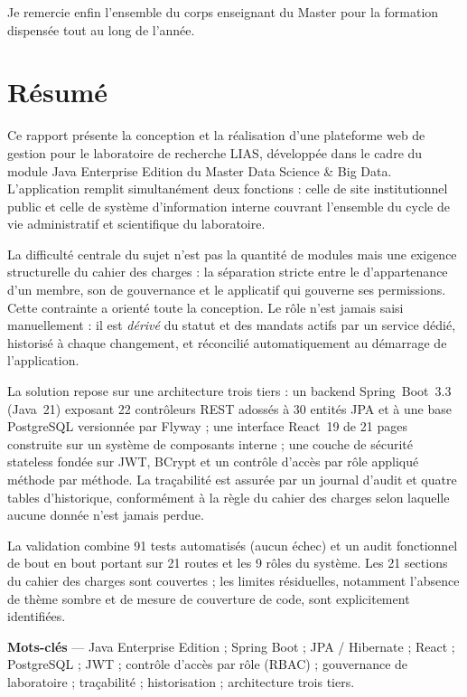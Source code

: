 Je remercie enfin l'ensemble du corps enseignant du Master pour la formation dispensée
tout au long de l'année.

\chapter*{Résumé}

Ce rapport présente la conception et la réalisation d'une plateforme web de gestion pour
le laboratoire de recherche LIAS, développée dans le cadre du module Java Enterprise
Edition du Master Data Science \& Big Data. L'application remplit simultanément deux
fonctions : celle de site institutionnel public et celle de système d'information interne
couvrant l'ensemble du cycle de vie administratif et scientifique du laboratoire.

La difficulté centrale du sujet n'est pas la quantité de modules mais une exigence
structurelle du cahier des charges : la séparation stricte entre le \srt{} d'appartenance
d'un membre, son \man{} de gouvernance et le \rol{} applicatif qui gouverne ses
permissions. Cette contrainte a orienté toute la conception. Le rôle n'est jamais saisi
manuellement : il est \emph{dérivé} du statut et des mandats actifs par un service
dédié, historisé à chaque changement, et réconcilié automatiquement au démarrage de
l'application.

La solution repose sur une architecture trois tiers : un backend Spring~Boot~3.3
(Java~21) exposant 22 contrôleurs REST adossés à 30 entités JPA et à une base
PostgreSQL versionnée par Flyway ; une interface React~19 de 21 pages construite sur un
système de composants interne ; une couche de sécurité stateless fondée sur JWT,
BCrypt et un contrôle d'accès par rôle appliqué méthode par méthode. La traçabilité est
assurée par un journal d'audit et quatre tables d'historique, conformément à la règle du
cahier des charges selon laquelle aucune donnée n'est jamais perdue.

La validation combine 91 tests automatisés (aucun échec) et un audit fonctionnel de bout
en bout portant sur 21 routes et les 9 rôles du système. Les 21 sections du cahier des
charges sont couvertes ; les limites résiduelles, notamment l'absence de thème sombre et
de mesure de couverture de code, sont explicitement identifiées.

\vspace{4mm}
\noindent\textbf{Mots-clés} --- Java Enterprise Edition ; Spring Boot ; JPA / Hibernate ;
React ; PostgreSQL ; JWT ; contrôle d'accès par rôle (RBAC) ; gouvernance de laboratoire ;
traçabilité ; historisation ; architecture trois tiers.

